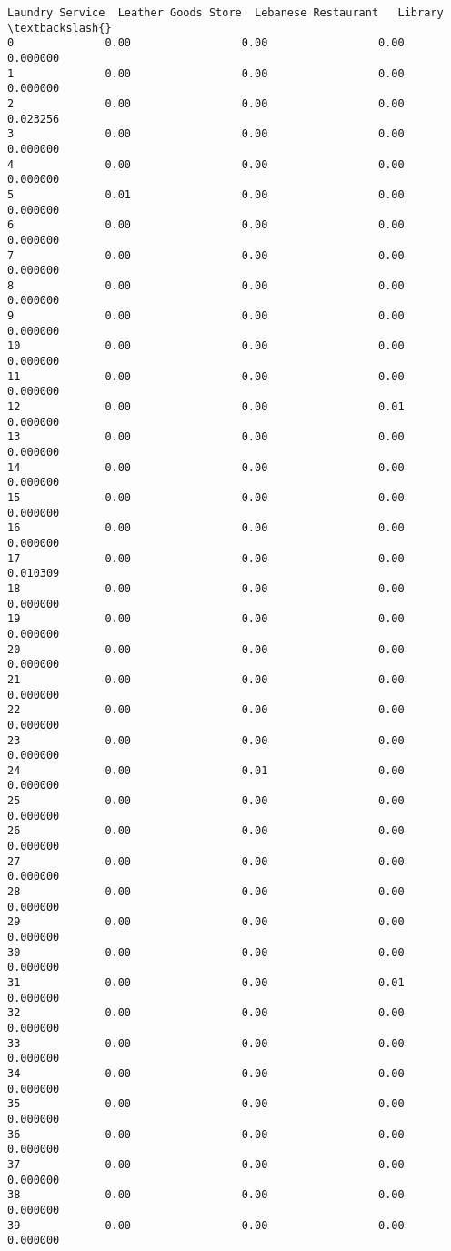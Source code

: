 \documentclass[11pt]{article}
\begin{document}
\begin{tcolorbox}[breakable, size=fbox, boxrule=.5pt, pad at break*=1mm, opacityfill=0]
\begin{Verbatim}[commandchars=\\\{\}]
    Laundry Service  Leather Goods Store  Lebanese Restaurant   Library  \textbackslash{}
0              0.00                 0.00                 0.00  0.000000
1              0.00                 0.00                 0.00  0.000000
2              0.00                 0.00                 0.00  0.023256
3              0.00                 0.00                 0.00  0.000000
4              0.00                 0.00                 0.00  0.000000
5              0.01                 0.00                 0.00  0.000000
6              0.00                 0.00                 0.00  0.000000
7              0.00                 0.00                 0.00  0.000000
8              0.00                 0.00                 0.00  0.000000
9              0.00                 0.00                 0.00  0.000000
10             0.00                 0.00                 0.00  0.000000
11             0.00                 0.00                 0.00  0.000000
12             0.00                 0.00                 0.01  0.000000
13             0.00                 0.00                 0.00  0.000000
14             0.00                 0.00                 0.00  0.000000
15             0.00                 0.00                 0.00  0.000000
16             0.00                 0.00                 0.00  0.000000
17             0.00                 0.00                 0.00  0.010309
18             0.00                 0.00                 0.00  0.000000
19             0.00                 0.00                 0.00  0.000000
20             0.00                 0.00                 0.00  0.000000
21             0.00                 0.00                 0.00  0.000000
22             0.00                 0.00                 0.00  0.000000
23             0.00                 0.00                 0.00  0.000000
24             0.00                 0.01                 0.00  0.000000
25             0.00                 0.00                 0.00  0.000000
26             0.00                 0.00                 0.00  0.000000
27             0.00                 0.00                 0.00  0.000000
28             0.00                 0.00                 0.00  0.000000
29             0.00                 0.00                 0.00  0.000000
30             0.00                 0.00                 0.00  0.000000
31             0.00                 0.00                 0.01  0.000000
32             0.00                 0.00                 0.00  0.000000
33             0.00                 0.00                 0.00  0.000000
34             0.00                 0.00                 0.00  0.000000
35             0.00                 0.00                 0.00  0.000000
36             0.00                 0.00                 0.00  0.000000
37             0.00                 0.00                 0.00  0.000000
38             0.00                 0.00                 0.00  0.000000
39             0.00                 0.00                 0.00  0.000000


\end{Verbatim}
\end{tcolorbox}
\end{document}
